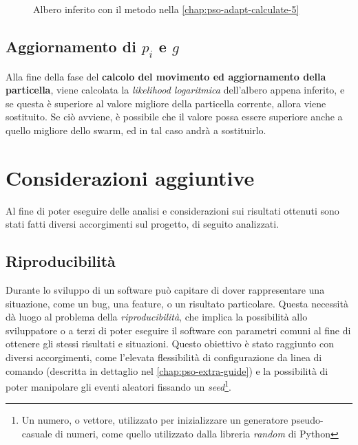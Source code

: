 \begin{figure}[!h]
  \centering
  \caption{Albero inferito con il metodo nella \autoref{chap:pso-adapt-calculate-5}}
  \label{fig:pso-adapt-calculate-5-tree}
\end{figure}

\subsection{Aggiornamento di $p_i$ e $g$}
Alla fine della fase del \textbf{calcolo del movimento ed aggiornamento della particella}, viene calcolata la \textit{likelihood logaritmica} dell'albero appena inferito, e se questa è superiore al valore migliore della particella corrente, allora viene sostituito. Se ciò avviene, è possibile che il valore possa essere superiore anche a quello migliore dello swarm, ed in tal caso andrà a sostituirlo.

\section{Considerazioni aggiuntive}
\label{chap:pso-extra}
Al fine di poter eseguire delle analisi e considerazioni sui risultati ottenuti sono stati fatti diversi accorgimenti sul progetto, di seguito analizzati.

\subsection{Riproducibilità}
\label{chap:pso-extra-ripro}
Durante lo sviluppo di un software può capitare di dover rappresentare una situazione, come un bug, una feature, o un risultato particolare. Questa necessità dà luogo al problema della \textit{riproducibilità}, che implica la possibilità allo sviluppatore o a terzi di poter eseguire il software con parametri comuni al fine di ottenere gli stessi risultati e situazioni. Questo obiettivo è stato raggiunto con diversi accorgimenti, come l'elevata flessibilità di configurazione da linea di comando (descritta in dettaglio nel \autoref{chap:pso-extra-guide}) e la possibilità di poter manipolare gli eventi aleatori fissando un \textit{seed}\footnote{Un numero, o vettore, utilizzato per inizializzare un generatore pseudo-casuale di numeri, come quello utilizzato dalla libreria \textit{random} di Python}.

